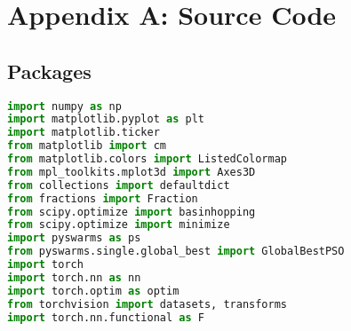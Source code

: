 \section{Appendix A: Source Code}
\lstlistoflistings
\subsection{Packages}
\begin{lstlisting}[language=Python, label={lst:code1}, mathescape=true, breaklines=true]
import numpy as np
import matplotlib.pyplot as plt 
import matplotlib.ticker
from matplotlib import cm 
from matplotlib.colors import ListedColormap
from mpl_toolkits.mplot3d import Axes3D
from collections import defaultdict
from fractions import Fraction
from scipy.optimize import basinhopping
from scipy.optimize import minimize
import pyswarms as ps
from pyswarms.single.global_best import GlobalBestPSO
import torch
import torch.nn as nn
import torch.optim as optim
from torchvision import datasets, transforms
import torch.nn.functional as F
\end{lstlisting}

